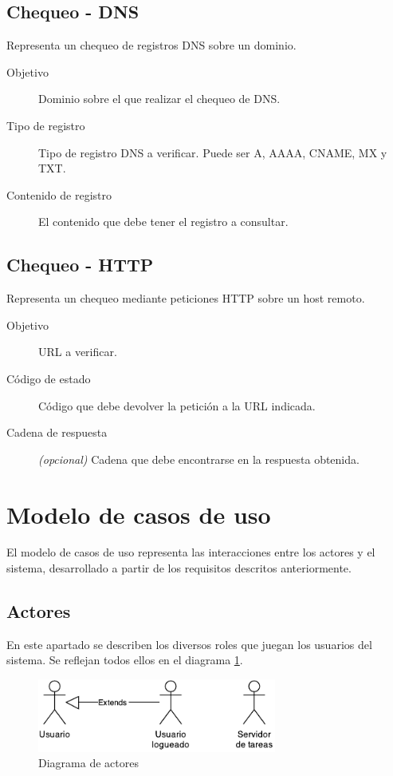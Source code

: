 \subsection{Chequeo - DNS}

Representa un chequeo de registros DNS sobre un dominio.

\begin{description}
\item[Objetivo] Dominio sobre el que realizar el chequeo de DNS.
\item[Tipo de registro] Tipo de registro DNS a verificar. Puede ser A, AAAA, CNAME, MX y TXT.
\item[Contenido de registro] El contenido que debe tener el registro a consultar.
\end{description}

\subsection{Chequeo - HTTP}

Representa un chequeo mediante peticiones HTTP sobre un host remoto.

\begin{description}
\item[Objetivo] URL a verificar.
\item[Código de estado] Código que debe devolver la petición a la URL indicada.
\item[Cadena de respuesta] \textit{(opcional)} Cadena que debe encontrarse en la
  respuesta obtenida.
\end{description}



\section{Modelo de casos de uso}

El modelo de casos de uso representa las interacciones entre los actores y el
sistema, desarrollado a partir de los requisitos descritos anteriormente.

\subsection{Actores}

En este apartado se describen los diversos roles que juegan los usuarios del
sistema. Se reflejan todos ellos en el diagrama \ref{fig:actores}.

\begin{figure}[h]
  \centering
  \includegraphics[width=0.7\textwidth]{4_analisis/diagrama_actores}
  \caption{Diagrama de actores}
  \label{fig:actores}
\end{figure}

